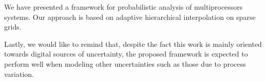 We have presented a framework for probabilistic analysis of multiprocessors
systems. Our approach is based on adaptive hierarchical interpolation on sparse
grids.

Lastly, we would like to remind that, despite the fact this work is mainly
oriented towards digital sources of uncertainty, the proposed framework is
expected to perform well when modeling other uncertainties such as those due to
process variation.
